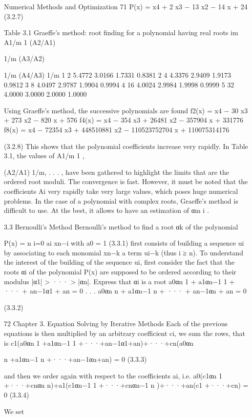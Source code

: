 \documentclass[letterpaper,12pt]{article}
\begin{document}
Numerical Methods and Optimization 71
P(x) = x4 + 2 x3 − 13 x2 − 14 x + 24 (3.2.7)

Table 3.1 Graeffe’s method: root finding for a polynomial having real roots
im A1/m
1 (A2/A1)

1/m (A3/A2)

1/m (A4/A3)
1/m
1 2 5.4772 3.0166 1.7331 0.8381
2 4 4.3376 2.9409 1.9173 0.9812
3 8 4.0497 2.9787 1.9904 0.9994
4 16 4.0024 2.9984 1.9998 0.9999
5 32 4.0000 3.0000 2.0000 1.0000

Using Graeffe’s method, the successive polynomials are found
f2(x) = x4 − 30 x3 + 273 x2 − 820 x + 576
f4(x) = x4 − 354 x3 + 26481 x2 − 357904 x + 331776
f8(x) = x4 − 72354 x3 + 448510881 x2 − 110523752704 x + 110075314176

(3.2.8)
This shows that the polynomial coefficients increase very rapidly. In Table 3.1, the values of A1/m
1 ,

(A2/A1)
1/m, . . . , have been gathered to highlight the limits that are the ordered root moduli. The
convergence is fast. However, it must be noted that the coefficients Ai very rapidly take very large
values, which poses huge numerical problems.
In the case of a polynomial with complex roots, Graeffe’s method is difficult to use. At the best, it
allows to have an estimation of αm
i .

3.3 Bernoulli’s Method
Bernoulli’s method to find a root αk of the polynomial

P(x) =
n
i=0
ai xn−i with a0 = 1 (3.3.1)
first consists of building a sequence {ui } by associating to each monomial xn−k a term
ui−k (thus i ≥ n).
To understand the interest of the building of the sequence ui, first consider the fact
that the roots αi of the polynomial P(x) are supposed to be ordered according to their
modulus |α1| > ··· > |αn|.
Express that αi is a root
a0αn
1 + a1αn−1
1 + ··· + an−1α1 + an = 0
.
.
.
a0αn
n + a1αn−1 n + ··· + an−1αn + an = 0

(3.3.2)

72 Chapter 3. Equation Solving by Iterative Methods
Each of the previous equations is then multiplied by an arbitrary coefficient ci, we sum
the rows, that is
c1(a0αn
1 +a1αn−1
1 +···+an−1α1+an)+···+cn(a0αn

n +a1αn−1 n +···+an−1αn+an) = 0
(3.3.3)

and then we order again with respect to the coefficients ai, i.e.
a0(c1αn
1 +···+cnαn
n)+a1(c1αn−1
1 +···+cnαn−1 n )+···+an(c1 +···+cn) = 0 (3.3.4)

We set
\end{document}
